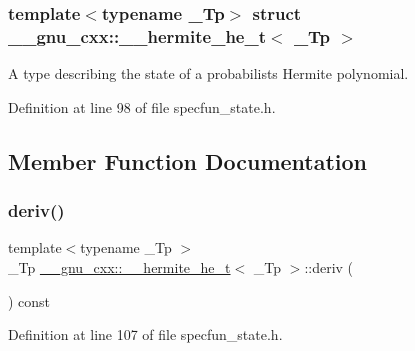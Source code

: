 \subsubsection*{template$<$typename \+\_\+\+Tp$>$\newline
struct \+\_\+\+\_\+gnu\+\_\+cxx\+::\+\_\+\+\_\+hermite\+\_\+he\+\_\+t$<$ \+\_\+\+Tp $>$}

A type describing the state of a probabilists Hermite polynomial. 

Definition at line 98 of file specfun\+\_\+state.\+h.



\subsection{Member Function Documentation}
\mbox{\label{struct____gnu__cxx_1_1____hermite__he__t_a19c1df6940043e1b106b8cf70bddd60e}} 
\subsubsection{\texorpdfstring{deriv()}{deriv()}}
{\footnotesize\ttfamily template$<$typename \+\_\+\+Tp $>$ \\
\+\_\+\+Tp \hyperlink{struct____gnu__cxx_1_1____hermite__he__t}{\+\_\+\+\_\+gnu\+\_\+cxx\+::\+\_\+\+\_\+hermite\+\_\+he\+\_\+t}$<$ \+\_\+\+Tp $>$\+::deriv (\begin{DoxyParamCaption}{ }\end{DoxyParamCaption}) const\hspace{0.3cm}{\ttfamily [inline]}}



Definition at line 107 of file specfun\+\_\+state.\+h.

\mbox{\label{struct____gnu__cxx_1_1____hermite__he__t_a4d885a96a96b12e9e8b6ad62628cfff3}} 

